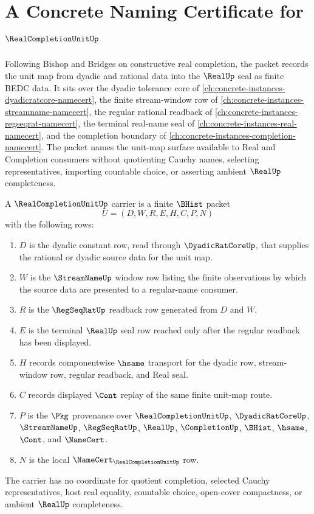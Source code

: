 \chapter{A Concrete Naming Certificate for $\RealCompletionUnitUp$}
\label{ch:concrete-instances-real-completion-unit-namecert}

Following Bishop and Bridges on constructive real completion, the packet records the unit map from dyadic and rational data into the $\RealUp$ seal as finite BEDC data. It sits over the dyadic tolerance core of \autoref{ch:concrete-instances-dyadicratcore-namecert}, the finite stream-window row of \autoref{ch:concrete-instances-streamname-namecert}, the regular rational readback of \autoref{ch:concrete-instances-regseqrat-namecert}, the terminal real-name seal of \autoref{ch:concrete-instances-real-namecert}, and the completion boundary of \autoref{ch:concrete-instances-completion-namecert}. The packet names the unit-map surface available to Real and Completion consumers without quotienting Cauchy names, selecting representatives, importing countable choice, or asserting ambient $\RealUp$ completeness.

\begin{definition}
\label{def:real-completion-unit-carrier}
A $\RealCompletionUnitUp$ carrier is a finite $\BHist$ packet
$$
U=(D,W,R,E,H,C,P,N)
$$
with the following rows:
\begin{enumerate}
\item $D$ is the dyadic constant row, read through $\DyadicRatCoreUp$, that supplies the rational or dyadic source data for the unit map.
\item $W$ is the $\StreamNameUp$ window row listing the finite observations by which the source data are presented to a regular-name consumer.
\item $R$ is the $\RegSeqRatUp$ readback row generated from $D$ and $W$.
\item $E$ is the terminal $\RealUp$ seal row reached only after the regular readback has been displayed.
\item $H$ records componentwise $\hsame$ transport for the dyadic row, stream-window row, regular readback, and Real seal.
\item $C$ records displayed $\Cont$ replay of the same finite unit-map route.
\item $P$ is the $\Pkg$ provenance over $\RealCompletionUnitUp$, $\DyadicRatCoreUp$, $\StreamNameUp$, $\RegSeqRatUp$, $\RealUp$, $\CompletionUp$, $\BHist$, $\hsame$, $\Cont$, and $\NameCert$.
\item $N$ is the local $\NameCert_{\RealCompletionUnitUp}$ row.
\end{enumerate}
The carrier has no coordinate for quotient completion, selected Cauchy representatives, host real equality, countable choice, open-cover compactness, or ambient $\RealUp$ completeness.
\end{definition}


